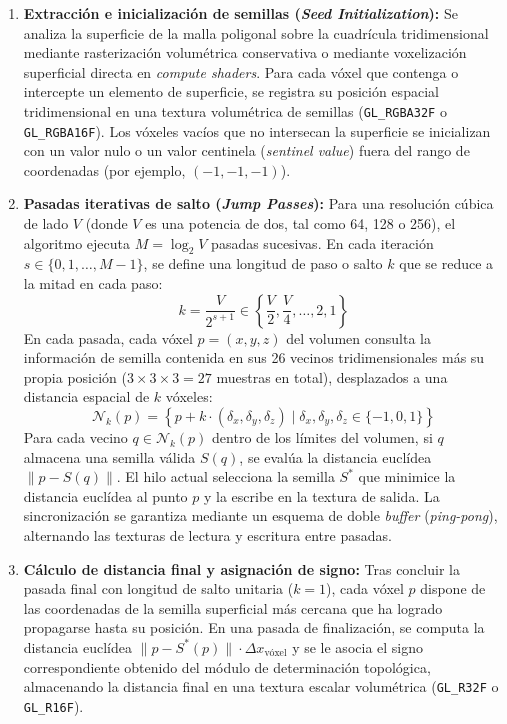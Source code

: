 \begin{enumerate}
  \item \textbf{Extracción e inicialización de semillas (\textit{Seed Initialization}):} Se analiza la superficie de la malla poligonal sobre la cuadrícula tridimensional mediante rasterización volumétrica conservativa o mediante voxelización superficial directa en \textit{compute shaders}. Para cada vóxel que contenga o intercepte un elemento de superficie, se registra su posición espacial tridimensional en una textura volumétrica de semillas (\texttt{GL\_RGBA32F} o \texttt{GL\_RGBA16F}). Los vóxeles vacíos que no intersecan la superficie se inicializan con un valor nulo o un valor centinela (\textit{sentinel value}) fuera del rango de coordenadas (por ejemplo, $(-1, -1, -1)$).
  \item \textbf{Pasadas iterativas de salto (\textit{Jump Passes}):} Para una resolución cúbica de lado $V$ (donde $V$ es una potencia de dos, tal como 64, 128 o 256), el algoritmo ejecuta $M = \log_2 V$ pasadas sucesivas. En cada iteración $s \in \{0, 1, \dots, M-1\}$, se define una longitud de paso o salto $k$ que se reduce a la mitad en cada paso:
  \begin{equation}
    k = \frac{V}{2^{s+1}} \in \left\{ \frac{V}{2}, \frac{V}{4}, \dots, 2, 1 \right\}
  \end{equation}
  En cada pasada, cada vóxel $p = (x, y, z)$ del volumen consulta la información de semilla contenida en sus 26 vecinos tridimensionales más su propia posición ($3 \times 3 \times 3 = 27$ muestras en total), desplazados a una distancia espacial de $k$ vóxeles:
  \begin{equation}
    \mathcal{N}_k(p) = \left\{ p + k \cdot (\delta_x, \delta_y, \delta_z) \mid \delta_x, \delta_y, \delta_z \in \{-1, 0, 1\} \right\}
  \end{equation}
  Para cada vecino $q \in \mathcal{N}_k(p)$ dentro de los límites del volumen, si $q$ almacena una semilla válida $S(q)$, se evalúa la distancia euclídea $\|p - S(q)\|$. El hilo actual selecciona la semilla $S^*$ que minimice la distancia euclídea al punto $p$ y la escribe en la textura de salida. La sincronización se garantiza mediante un esquema de doble \textit{buffer} (\textit{ping-pong}), alternando las texturas de lectura y escritura entre pasadas.
  \item \textbf{Cálculo de distancia final y asignación de signo:} Tras concluir la pasada final con longitud de salto unitaria ($k=1$), cada vóxel $p$ dispone de las coordenadas de la semilla superficial más cercana que ha logrado propagarse hasta su posición. En una pasada de finalización, se computa la distancia euclídea $\|p - S^*(p)\| \cdot \Delta x_{\text{vóxel}}$ y se le asocia el signo correspondiente obtenido del módulo de determinación topológica, almacenando la distancia final en una textura escalar volumétrica (\texttt{GL\_R32F} o \texttt{GL\_R16F}).
\end{enumerate}

